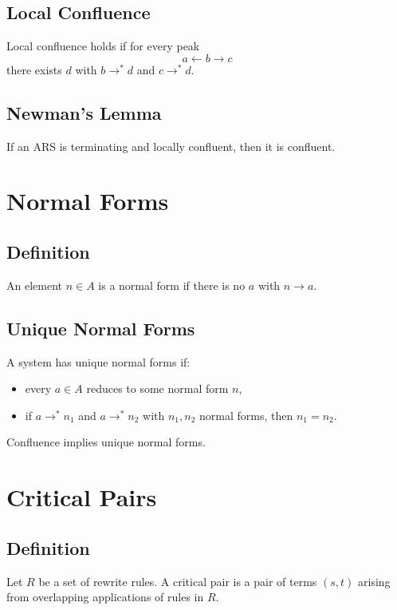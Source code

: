 \subsection{Local Confluence}

Local confluence holds if for every peak
\[
a \leftarrow b \to c
\]
there exists $d$ with $b \to^\ast d$ and $c \to^\ast d$.

\subsection{Newman's Lemma}

If an ARS is terminating and locally confluent, then it is confluent.

\section{Normal Forms}

\subsection{Definition}

An element $n\in A$ is a normal form if there is no $a$ with $n\to a$.

\subsection{Unique Normal Forms}

A system has unique normal forms if:
\begin{itemize}
\item every $a\in A$ reduces to some normal form $n$,
\item if $a\to^\ast n_1$ and $a\to^\ast n_2$ with $n_1,n_2$ normal forms, then $n_1 = n_2$.
\end{itemize}

Confluence implies unique normal forms.

\section{Critical Pairs}

\subsection{Definition}

Let $R$ be a set of rewrite rules.  
A critical pair is a pair of terms $(s,t)$ arising from overlapping applications of rules in $R$.

